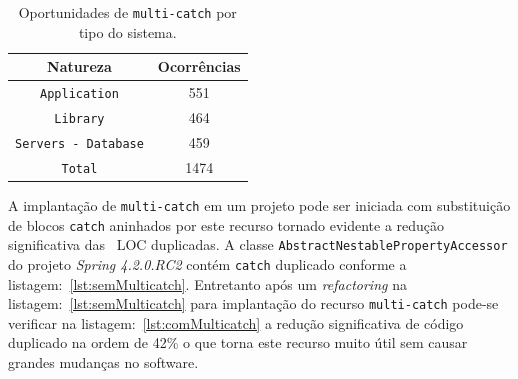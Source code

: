 \begin{table}[h]
	\centering
	\caption{Oportunidades de \texttt{multi-catch} por tipo do sistema.}
	\begin{tabular}{cc}
		\hline
		Natureza & Ocorrências \\ 
		\hline \hline
		\texttt{Application} & 551 \\ 
		\texttt{Library} &  464 \\ 
		\texttt{Servers - Database} &  459 \\ \hline
		\texttt{Total} &  1474 \\ \hline
	\end{tabular}
	\label{tab:oportunidadesMulticatch} %
\end{table}
		
A implantação de \texttt{multi-catch} em um projeto pode ser iniciada com substituição de blocos \texttt{catch} aninhados por este recurso tornado evidente a redução significativa das ~\acs{LOC} duplicadas. A classe \texttt{AbstractNestablePropertyAccessor} do projeto  \textit{Spring 4.2.0.RC2} contém \texttt{catch} duplicado conforme a listagem:~\ref{lst:semMulticatch}. Entretanto após um \textit{refactoring} na listagem:~\ref{lst:semMulticatch} para implantação do recurso \texttt{multi-catch} pode-se verificar na listagem:~\ref{lst:comMulticatch} a redução significativa de código duplicado na ordem de \num{42}\% o que torna este recurso muito útil sem causar grandes mudanças no software.


